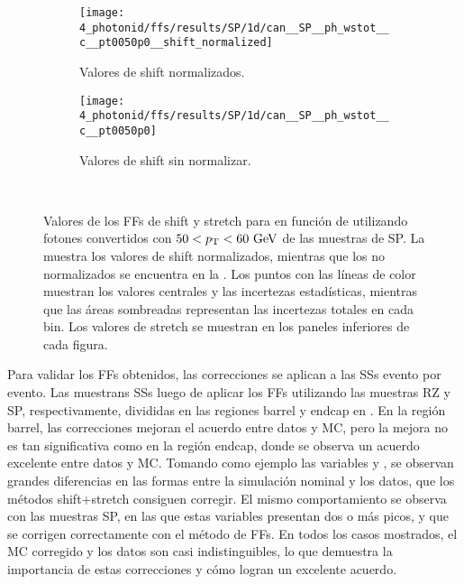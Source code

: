 \begin{figure}[ht!]
    \centering
    \begin{subfigure}[h]{0.49\linewidth}
        \centering
        \texttt{[image: 4\_photonid/ffs/results/SP/1d/can\_\_SP\_\_ph\_wstot\_\_c\_\_pt0050p0\_\_shift\_normalized]}
        \caption{Valores de shift normalizados.}
        \label{fig:ss_corrections:ffs:reslts:ffs_eta_wstot:normalised_shift}
    \end{subfigure}
    \hfill
    \begin{subfigure}[h]{0.49\linewidth}
        \centering
        \texttt{[image: 4\_photonid/ffs/results/SP/1d/can\_\_SP\_\_ph\_wstot\_\_c\_\_pt0050p0]}
        \caption{Valores de shift sin normalizar.}
        \label{fig:ss_corrections:ffs:reslts:ffs_eta_wstot:raw_shift}
    \end{subfigure}\\
    \caption{Valores de los \acp{FF} de shift y stretch para \wstot en funci\'on de \abseta utilizando fotones convertidos con \(50<p_{\text{T}}<60~\text{GeV}\) de las muestras de \ac{SP}. La  muestra los valores de shift normalizados, mientras que los no normalizados se encuentra en la . Los puntos con las l\'ineas de color muestran los valores centrales y las incertezas estad\'isticas, mientras que las \'areas sombreadas representan las incertezas totales en cada bin. Los valores de stretch se muestran en los paneles inferiores de cada figura.}
    \label{fig:ss_corrections:ffs:reslts:ffs_eta_wstot}
\end{figure}


Para validar los \acp{FF} obtenidos, las correcciones se aplican a las \acp{SS} evento por evento.
Las \Figs{\ref{fig:ss_corrections:ffs:results:ss_rz}}{\ref{fig:ss_corrections:ffs:results:ss_sp}} muestrans \acp{SS} luego de aplicar los \acp{FF} utilizando las muestras \ac{RZ} y \ac{SP}, respectivamente, divididas en las regiones barrel y endcap en \abseta. En la región barrel, las correcciones mejoran el acuerdo entre datos y \ac{MC}, pero la mejora no es tan significativa como en la región endcap, donde se observa un acuerdo excelente entre datos y \ac{MC}. Tomando como ejemplo las variables \wone y \wstot, se observan grandes diferencias en las formas entre la simulación nominal y los datos, que los métodos shift+stretch consiguen corregir. El mismo comportamiento se observa con las muestras \ac{SP}, en las que estas variables presentan dos o más picos, y que se corrigen correctamente con el método de \acp{FF}. En todos los casos mostrados, el \ac{MC} corregido y los datos son casi indistinguibles, lo que demuestra la importancia de estas correcciones y cómo logran un excelente acuerdo.

